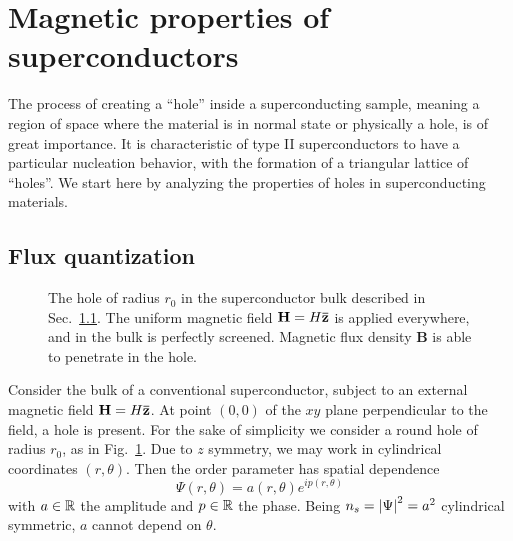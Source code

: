 \section{Magnetic properties of superconductors}

The process of creating a ``hole'' inside a superconducting sample, meaning a region of space where the material is in normal state or physically a hole, is of great importance. It is characteristic of type II superconductors to have a particular nucleation behavior, with the formation of a triangular lattice of ``holes''. We start here by analyzing the properties of holes in superconducting materials. 

\subsection{Flux quantization}\label{subsec:flux quantization}

\begin{figure}
    \centering
    
    \caption{The hole of radius $r_0$ in the superconductor bulk described in Sec.~\ref{subsec:flux quantization}. The uniform magnetic field $\mathbf{H}=H\mathbf{\bar{z}}$ is applied everywhere, and in the bulk is perfectly screened. Magnetic flux density $\mathbf{B}$ is able to penetrate in the hole.}
    \label{fig:hole in superconductor}
\end{figure}

Consider the bulk of a conventional superconductor, subject to an external magnetic field $\mathbf{H} = H \mathbf{\bar{z}}$. At point $(0,0)$ of the $xy$ plane perpendicular to the field, a hole is present. For the sake of simplicity we consider a round hole of radius $r_0$, as in Fig.~\ref{fig:hole in superconductor}. Due to $z$ symmetry, we may work in cylindrical coordinates $(r,\theta)$. Then the order parameter has spatial dependence
\[
    \Psi(r,\theta) = a(r,\theta) e^{ip(r,\theta)}
\]
with $a \in \mathbb{R}$ the amplitude and $p \in \mathbb{R}$ the phase. Being $n_s = \abs{\Psi}^2 = a^2$ cylindrical symmetric, $a$ cannot depend on $\theta$.

